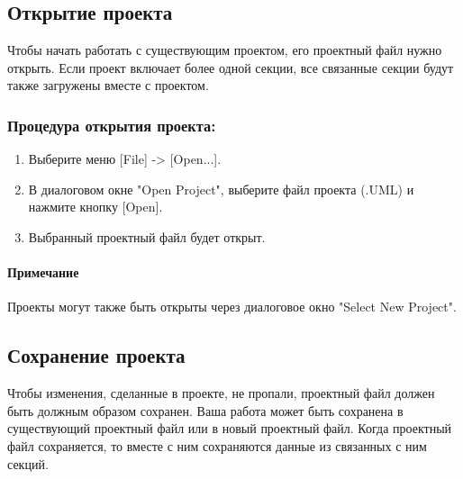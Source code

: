 \documentclass[a4paper,12pt]{report}
\begin{document}
\subsection*{Открытие проекта}
Чтобы начать работать с существующим проектом, его проектный файл нужно открыть. Если
проект включает более одной секции, все связанные секции будут также загружены вместе с
проектом.

\subsubsection*{Процедура открытия проекта:}
\begin{enumerate}
	\item Выберите меню [File] -> [Open...].
	\item В диалоговом окне "Open Project", выберите файл проекта (.UML) и нажмите кнопку
	[Open].
	\item Выбранный проектный файл будет открыт.
\end{enumerate}

\paragraph{Примечание}
Проекты могут также быть открыты через диалоговое окно "Select New Project".

\subsection*{Сохранение проекта}
Чтобы изменения, сделанные в проекте, не пропали, проектный файл должен быть должным
образом сохранен. Ваша работа может быть сохранена в существующий проектный файл или в 
новый проектный файл. Когда проектный файл сохраняется, то вместе с ним сохраняются данные
из связанных с ним секций.
\end{document}
